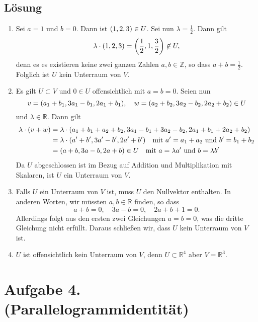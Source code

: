 \documentclass[german,12pt]{homework}
\newcommand{\ZZ}{\mathbb{Z}}
\newcommand{\RR}{\mathbb{R}}
\DeclarePairedDelimiter{\enbrace}{(}{)}
\begin{document}
    \subsection*{Lösung}
    \begin{enumerate}
        \item Sei \(a = 1\) und \(b = 0\). Dann ist \(\enbrace*{1, 2, 3} \in U\). Sei nun \(\lambda = \frac{1}{2}\). Dann gilt
        \[\lambda \cdot \enbrace*{1, 2, 3} = \enbrace*{\frac{1}{2}, 1, \frac{3}{2}} \not\in U,\]
        denn es es existieren keine zwei ganzen Zahlen \(a, b \in \ZZ\), so dass \(a + b = \frac{1}{2}\). Folglich ist \(U\) kein Unterraum von \(V\).
        \item Es gilt \(U \subset V\) und \(0 \in U\) offensichtlich mit \(a = b = 0\). Seien nun
        \[v = \enbrace*{a_1 + b_1, 3a_1 - b_1, 2a_1 + b_1}, \quad w = \enbrace*{a_2 + b_2, 3a_2 - b_2, 2a_2 + b_2} \in U\]
        und \(\lambda \in \RR\). Dann gilt
        \begin{align*}
            \lambda \cdot \enbrace*{v + w} &= \lambda \cdot \enbrace*{a_1 + b_1 + a_2 + b_2, 3a_1 - b_1 + 3a_2 - b_2, 2a_1 + b_1 + 2a_2 + b_2}\\
            &= \lambda \cdot \enbrace*{a' + b', 3a' - b', 2a' + b'} \quad \text{mit }a' = a_1 + a_2\text{ und }b' = b_1 + b_2\\
            &= \enbrace*{a + b, 3a - b, 2a + b} \in U \quad \text{mit }a = \lambda{a'}\text{ und }b = \lambda{b'}
        \end{align*}
        Da \(U\) abgeschlossen ist im Bezug auf Addition und Multiplikation mit Skalaren, ist \(U\) ein Unterraum von \(V\).
        \item Falls \(U\) ein Unterraum von \(V\) ist, muss \(U\) den Nullvektor enthalten. In anderen Worten, wir müssten \(a, b \in \RR\) finden, so dass
        \[a + b = 0, \quad 3a - b = 0, \quad 2a + b + 1 = 0.\]
        Allerdings folgt aus den ersten zwei Gleichungen \(a = b = 0\), was die dritte Gleichung nicht erfüllt. Daraus schließen wir, dass \(U\) kein Unterraum von \(V\) ist.
        \item \(U\) ist offensichtlich kein Unterraum von \(V\), denn \(U \subset \mathbb{R}^4\) aber \(V = \mathbb{R}^3\).
    \end{enumerate}

    \section*{Aufgabe 4. (Parallelogrammidentität)}
\end{document}
